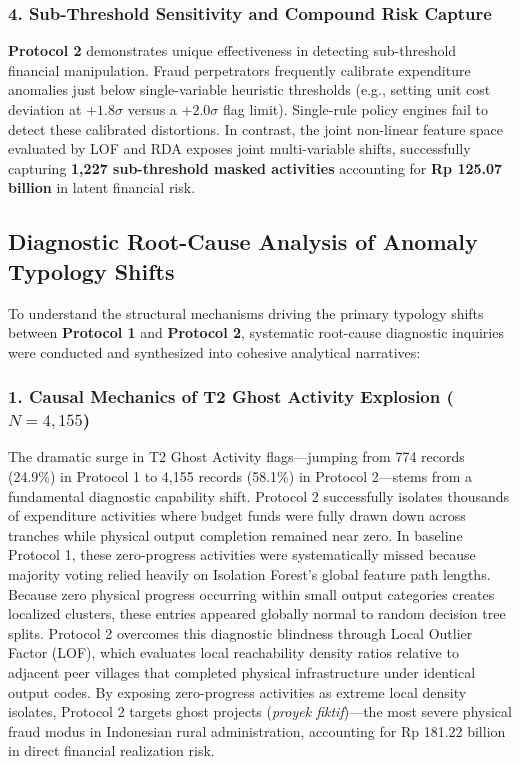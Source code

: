 \documentclass[runningheads]{llncs}
\begin{document}
\subsubsection{4. Sub-Threshold Sensitivity and Compound Risk Capture}
\textbf{Protocol 2} demonstrates unique effectiveness in detecting sub-threshold financial manipulation. Fraud perpetrators frequently calibrate expenditure anomalies just below single-variable heuristic thresholds (e.g., setting unit cost deviation at $+1.8\sigma$ versus a $+2.0\sigma$ flag limit). Single-rule policy engines fail to detect these calibrated distortions. In contrast, the joint non-linear feature space evaluated by LOF and RDA exposes joint multi-variable shifts, successfully capturing \textbf{1,227 sub-threshold masked activities} accounting for \textbf{Rp 125.07 billion} in latent financial risk.

\subsection{Diagnostic Root-Cause Analysis of Anomaly Typology Shifts}
To understand the structural mechanisms driving the primary typology shifts between \textbf{Protocol 1} and \textbf{Protocol 2}, systematic root-cause diagnostic inquiries were conducted and synthesized into cohesive analytical narratives:

\subsubsection{1. Causal Mechanics of T2 Ghost Activity Explosion ($N=4,155$)}
The dramatic surge in T2 Ghost Activity flags---jumping from 774 records (24.9\%) in Protocol 1 to 4,155 records (58.1\%) in Protocol 2---stems from a fundamental diagnostic capability shift. Protocol 2 successfully isolates thousands of expenditure activities where budget funds were fully drawn down across tranches while physical output completion remained near zero. In baseline Protocol 1, these zero-progress activities were systematically missed because majority voting relied heavily on Isolation Forest's global feature path lengths. Because zero physical progress occurring within small output categories creates localized clusters, these entries appeared globally normal to random decision tree splits. Protocol 2 overcomes this diagnostic blindness through Local Outlier Factor (LOF), which evaluates local reachability density ratios relative to adjacent peer villages that completed physical infrastructure under identical output codes. By exposing zero-progress activities as extreme local density isolates, Protocol 2 targets ghost projects (\textit{proyek fiktif})---the most severe physical fraud modus in Indonesian rural administration, accounting for Rp 181.22 billion in direct financial realization risk.
\end{document}

